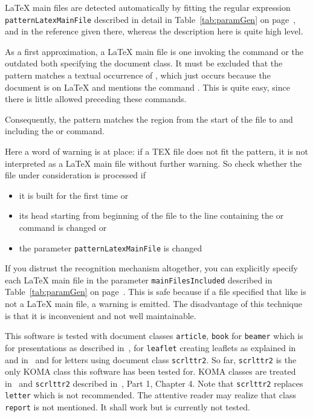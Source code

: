 \LaTeX{} main files are detected automatically 
by fitting the regular expression \texttt{patternLatexMainFile} 
described in detail in Table~\ref{tab:paramGen} on page~\pageref{tab:paramGen}, 
and in the reference given there, 
whereas the description here is quite high level. 

As a first approximation, a \LaTeX{} main file is one invoking 
the command  
or the outdated  both specifying the document class. 
It must be excluded that the pattern matches a textual occurrence of , 
which just occurs because the document is on \LaTeX{} 
and mentions the command . 
This is quite easy, since there is little allowed preceding these commands. 

Consequently, the pattern matches the region from the start of the file 
to and including the  or  command. 

Here a word of warning is at place: if a TEX file does not fit the pattern, 
it is not interpreted as a \LaTeX{} main file without further warning. 
So check whether the file under consideration is processed if 
%
\begin{itemize}
  \item 
  it is built for the first time or 
  \item 
  its head starting from beginning of the file 
  to the line containing the  or  command 
  is changed or
  \item 
  the parameter \texttt{patternLatexMainFile} is changed 
\end{itemize}
%
If you distrust the recognition mechanism altogether, 
you can explicitly specify each \LaTeX{} main file in the parameter \texttt{mainFilesIncluded} 
described in Table~\ref{tab:paramGen} on page~\pageref{tab:paramGen}. 
This is safe because if a file specified that like is not a \LaTeX{} main file, 
a warning is emitted. 
The disadvantage of this technique is that it is inconvenient and not well maintainable. 

This software is tested with document classes \texttt{article}, \texttt{book} 
for \texttt{beamer} which is for presentations as described in~\cite{Beamer}, 
for \texttt{leaflet} creating leaflets as explained in~\cite{Leaflet} and in~\cite{LeafletMan} 
and for letters using document class \texttt{scrlttr2}. 
So far, \texttt{scrlttr2} is the only KOMA class this software has been tested for. 
KOMA classes are treated in~\cite{KomaAnl} and \texttt{scrlttr2} described in~\cite{KomaAnl}, Part 1, Chapter 4. 
Note that \texttt{scrlttr2} replaces \texttt{letter} which is not recommended. 
The attentive reader may realize that class \texttt{report} is not mentioned. 
It shall work but is currently not tested. 

